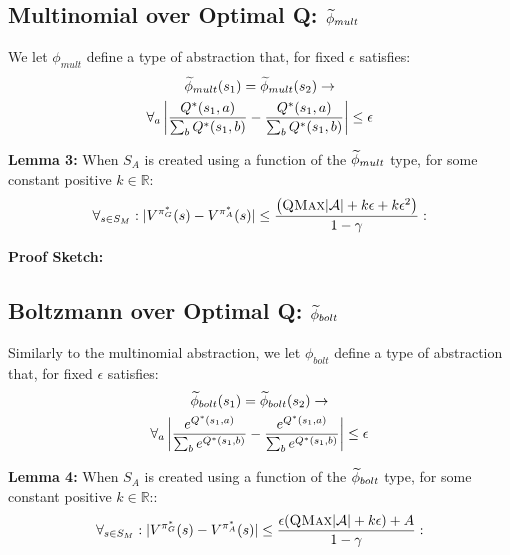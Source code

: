 \subsection{Multinomial over Optimal Q: $\widetilde \phi_{mult}$}

We let $\phi_{mult}$ define a type of abstraction that, for fixed $\epsilon$ satisfies:
\begin{multline}
\widetilde \phi_{mult}(s_1) = \widetilde \phi_{mult}(s_2) \rightarrow \\
\forall_{a} \left|\frac{Q^*(s_1,a)}{\sum_b Q^*(s_1,b)} - \frac{Q^*(s_1,a)}{\sum_b Q^*(s_1,b)}\right| \leq \epsilon
\end{multline}


{\bf Lemma 3:} When $S_A$ is created using a function of the $\widetilde \phi_{mult}$ type, for some constant positive $k \in \mathbb{R}$:
\begin{equation}
\forall_{s \in S_M} : | V^{\pi^*_G}(s) - V^{\pi^*_{A}}(s) | \leq \frac{\left(\textsc{QMax}|\mathcal{A}| + k \epsilon + k \epsilon^2\right)}{1-\gamma}:
\end{equation}



{\bf Proof Sketch:}



\subsection{Boltzmann over Optimal Q: $\widetilde \phi_{bolt}$}

Similarly to the multinomial abstraction, we let $\phi_{bolt}$ define a type of abstraction that, for fixed $\epsilon$ satisfies:
\begin{multline}
\widetilde \phi_{bolt}(s_1) = \widetilde \phi_{bolt}(s_2) \rightarrow \\
\forall_{a} \left|\frac{e^{Q^*(s_1,a)}}{\sum_b e^{Q^*(s_1,b)}} - \frac{e^{Q^*(s_1,a)}}{\sum_b e^{Q^*(s_1,b)}}\right| \leq \epsilon
\end{multline}

{\bf Lemma 4:} When $S_A$ is created using a function of the $\widetilde \phi_{bolt}$ type, for some constant positive $k \in \mathbb{R}$::
\begin{equation}
\forall_{s \in S_M} : | V^{\pi^*_G}(s) - V^{\pi^*_{A}}(s) | \leq \frac{\epsilon(\textsc{QMax}|\mathcal{A}| + k\epsilon) + A}{1-\gamma}:
\end{equation}


